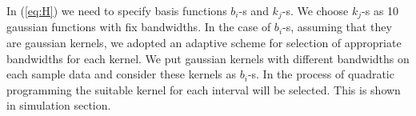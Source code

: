 In (\ref{eq:H}) we need to specify basis functions $b_i$-s and $k_j$-s. We choose $k_j$-s as 10 gaussian functions with fix bandwidths. In the case of $b_i$-s, assuming that they are gaussian kernels, we adopted an adaptive scheme for selection of appropriate bandwidths for each kernel. We put gaussian kernels with different bandwidths on each sample data and consider these kernels as $b_i$-s. In the process of quadratic programming the suitable kernel for each interval will be selected. This is shown in simulation section.